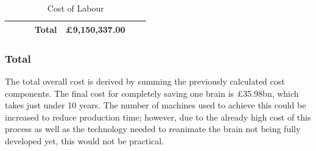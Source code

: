 \documentclass[a4paper, 11pt]{article}
\numberwithin{equation}{section}
\begin{document}
\begin{table}[H]
{\begin{tabular}{|l|l|l|l|l|l|l|}
 	&		&		&	\multicolumn{1}{r|}{		\textbf{Total}	}	&	\multicolumn{1}{r|}{	\textbf{\pounds 9,150,337.00}		}	\\	\hline

\end{tabular}
}
\captionsetup{justification=centering}
\caption{Cost of Labour}
\label{table:labourcost}
\end{table}



\subsubsection{Total}

The total overall cost is derived by summing the previously calculated  cost components. The final cost for completely saving one brain is \pounds 35.98bn, which takes just under 10 years. The number of machines used to achieve this could be increased to reduce production time; however, due to the already high cost of this process as well as the technology needed to reanimate the brain not being fully developed yet, this would not be practical. 
 
\end{document}
